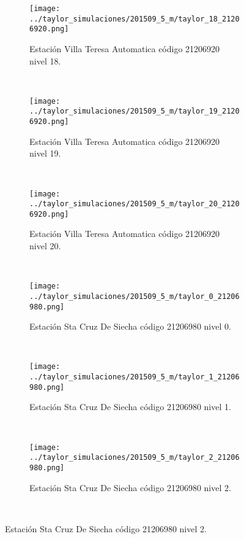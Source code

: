\begin{figure}[H]\ContinuedFloat
\centering
\begin{subfigure}[normla]{0.4\textwidth}
\caption{Estación Villa Teresa Automatica  código 21206920 nivel 18.}
\texttt{[image: ../taylor\_simulaciones/201509\_5\_m/taylor\_18\_21206920.png]}
\end{subfigure}
~
\begin{subfigure}[normla]{0.4\textwidth}
\caption{Estación Villa Teresa Automatica  código 21206920 nivel 19.}
\texttt{[image: ../taylor\_simulaciones/201509\_5\_m/taylor\_19\_21206920.png]}
\end{subfigure}
~
\begin{subfigure}[normla]{0.4\textwidth}
\caption{Estación Villa Teresa Automatica  código 21206920 nivel 20.}
\texttt{[image: ../taylor\_simulaciones/201509\_5\_m/taylor\_20\_21206920.png]}
\end{subfigure}
~
\begin{subfigure}[normla]{0.4\textwidth}
\caption{Estación Sta Cruz De Siecha  código 21206980 nivel 0.}
\texttt{[image: ../taylor\_simulaciones/201509\_5\_m/taylor\_0\_21206980.png]}
\end{subfigure}
~
\begin{subfigure}[normla]{0.4\textwidth}
\caption{Estación Sta Cruz De Siecha  código 21206980 nivel 1.}
\texttt{[image: ../taylor\_simulaciones/201509\_5\_m/taylor\_1\_21206980.png]}
\end{subfigure}
~
\begin{subfigure}[normla]{0.4\textwidth}
\caption{Estación Sta Cruz De Siecha  código 21206980 nivel 2.}
\texttt{[image: ../taylor\_simulaciones/201509\_5\_m/taylor\_2\_21206980.png]}
\end{subfigure}
~
\end{figure}
           
